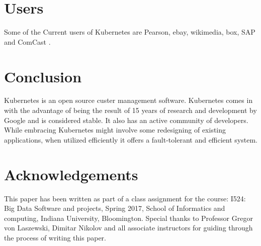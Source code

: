 \documentclass[9pt,twocolumn,twoside]{styles/osajnl}
\begin{document}
\section{Users}
Some of the Current users of Kubernetes are Pearson, ebay, wikimedia, box, SAP and ComCast \cite{www-kubernetesusers}.
\section{Conclusion}
Kubernetes is an open source custer management software. Kubernetes comes in with the advantage of being the result of 15 years of research and development by Google and is considered stable. It also has an active community of developers. While embracing Kubernetes might involve some redesigning of existing applications, when utilized efficiently it offers a fault-tolerant and efficient system.



\section*{Acknowledgements}

This paper has been written as part of a class assignment for the course: 
I524: Big Data Software and projects, Spring 2017, School of Informatics and computing, Indiana University, Bloomington.
Special thanks to Professor Gregor von Laszewski, Dimitar Nikolov and all associate instructors for guiding through the process of writing this paper.




 
\end{document}
